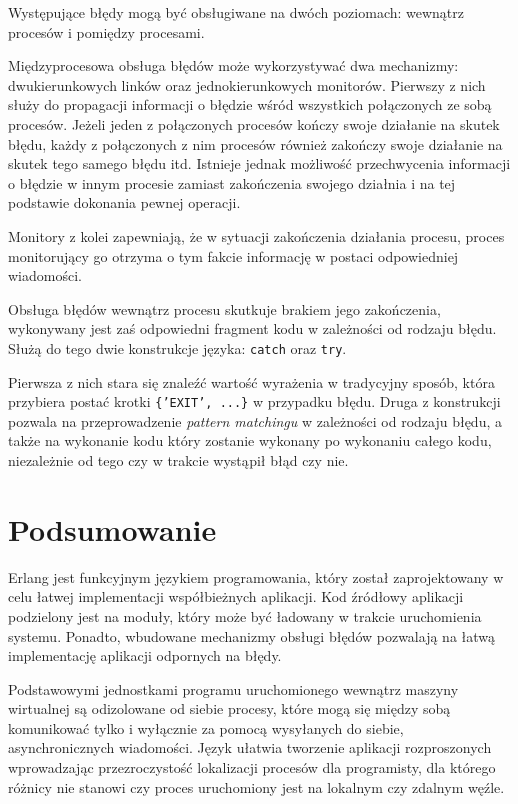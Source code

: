 Występujące błędy mogą być obsługiwane na dwóch poziomach: wewnątrz procesów i pomiędzy procesami.

Międzyprocesowa obsługa błędów może wykorzystywać dwa mechanizmy: dwukierunkowych linków oraz jednokierunkowych monitorów.
Pierwszy z nich służy do propagacji informacji o błędzie wśród wszystkich połączonych ze sobą procesów.
Jeżeli jeden z połączonych procesów kończy swoje działanie na skutek błędu, każdy z połączonych z nim procesów również zakończy swoje działanie na skutek tego samego błędu itd.
Istnieje jednak możliwość przechwycenia informacji o błędzie w innym procesie zamiast zakończenia swojego działnia i na tej podstawie dokonania pewnej operacji.

Monitory z kolei zapewniają, że w sytuacji zakończenia działania procesu, proces monitorujący go otrzyma o tym fakcie informację w postaci odpowiedniej wiadomości.

Obsługa błędów wewnątrz procesu skutkuje brakiem jego zakończenia, wykonywany jest zaś odpowiedni fragment kodu w zależności od rodzaju błędu. Służą do tego dwie konstrukcje języka: \texttt{catch} oraz \texttt{try}.

Pierwsza z nich stara się znaleźć wartość wyrażenia w tradycyjny sposób, która przybiera postać krotki \texttt{\{'EXIT', ...\}} w przypadku błędu.
Druga z konstrukcji pozwala na przeprowadzenie \emph{pattern matchingu} w zależności od rodzaju błędu, a także na wykonanie kodu który zostanie wykonany po wykonaniu całego kodu, niezależnie od tego czy w trakcie wystąpił błąd czy nie.

\section{Podsumowanie}
\label{sec:erlangPodsumowanie}

Erlang jest funkcyjnym językiem programowania, który został zaprojektowany w celu łatwej implementacji współbieżnych aplikacji.
Kod źródłowy aplikacji podzielony jest na moduły, który może być ładowany w trakcie uruchomienia systemu.
Ponadto, wbudowane mechanizmy obsługi błędów pozwalają na łatwą implementację aplikacji odpornych na błędy.

Podstawowymi jednostkami programu uruchomionego wewnątrz maszyny wirtualnej są odizolowane od siebie procesy, które mogą się między sobą komunikować tylko i wyłącznie za pomocą wysyłanych do siebie, asynchronicznych wiadomości.
Język ułatwia tworzenie aplikacji rozproszonych wprowadzając przezroczystość lokalizacji procesów dla programisty, dla którego różnicy nie stanowi czy proces uruchomiony jest na lokalnym czy zdalnym węźle.
